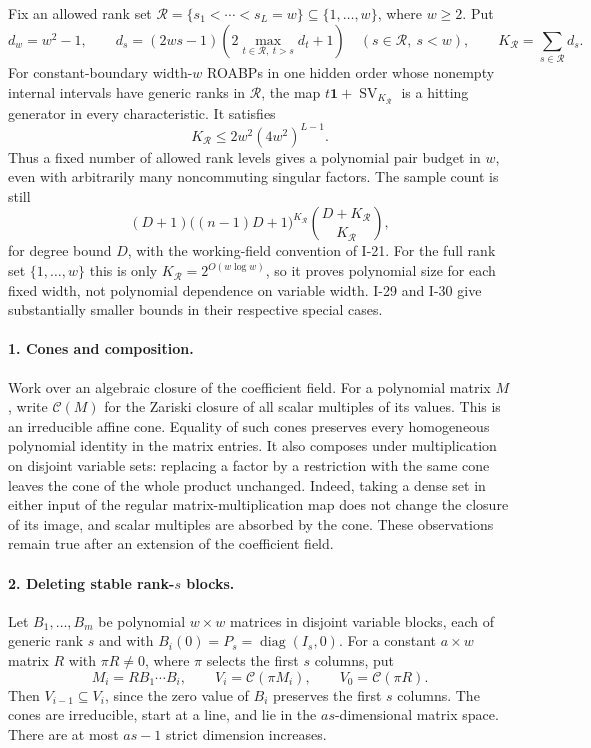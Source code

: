 Fix an allowed rank set
$\mathcal R=\{s_1<\cdots<s_L=w\}\subseteq\{1,\ldots,w\}$,
where $w\ge2$.  Put
\[
 d_w=w^2-1,\qquad
 d_s=(2ws-1)\left(2\max_{t\in\mathcal R,\ t>s}d_t+1\right)
       \quad(s\in\mathcal R,\ s<w),
 \qquad K_{\mathcal R}=\sum_{s\in\mathcal R}d_s.
 \tag{I.50}
\]
For constant-boundary width-$w$ ROABPs in one hidden order
whose nonempty internal intervals have generic ranks in
$\mathcal R$, the map $t\mathbf1+\operatorname{SV}_{K_{\mathcal R}}$
is a hitting generator in every characteristic.  It satisfies
\[
 K_{\mathcal R}\le2w^2(4w^2)^{L-1}.
 \tag{I.51}
\]
Thus a fixed number of allowed rank levels gives a polynomial
pair budget in $w$, even with arbitrarily many noncommuting
singular factors.  The sample count is still
\[
 (D+1)\bigl((n-1)D+1\bigr)^{K_{\mathcal R}}
                  \binom{D+K_{\mathcal R}}{K_{\mathcal R}},
 \tag{I.52}
\]
for degree bound $D$, with the working-field convention of
I-21.  For the full rank set $\{1,\ldots,w\}$ this is only
$K_{\mathcal R}=2^{O(w\log w)}$, so it proves polynomial size
for each fixed width, not polynomial dependence on variable
width.  I-29 and I-30 give substantially smaller bounds in
their respective special cases.

\paragraph{1. Cones and composition.}
Work over an algebraic closure of the coefficient field.
For a polynomial matrix $M$, write $\mathcal C(M)$ for the
Zariski closure of all scalar multiples of its values.
This is an irreducible affine cone.  Equality of such cones
preserves every homogeneous polynomial identity in the matrix
entries.  It also composes under multiplication on disjoint
variable sets: replacing a factor by a restriction with the
same cone leaves the cone of the whole product unchanged.
Indeed, taking a dense set in either input of the regular
matrix-multiplication map does not change the closure of its
image, and scalar multiples are absorbed by the cone.
These observations remain true after an extension of the
coefficient field.

\paragraph{2. Deleting stable rank-$s$ blocks.}
Let $B_1,\ldots,B_m$ be polynomial $w\times w$ matrices in
disjoint variable blocks, each of generic rank $s$ and with
$B_i(0)=P_s=\operatorname{diag}(I_s,0)$.
For a constant $a\times w$ matrix $R$ with $\pi R\ne0$,
where $\pi$ selects the first $s$ columns, put
\[
 M_i=RB_1\cdots B_i,\qquad
 V_i=\mathcal C(\pi M_i),\qquad V_0=\mathcal C(\pi R).
\]
Then $V_{i-1}\subseteq V_i$, since the zero value of $B_i$
preserves the first $s$ columns.  The cones are irreducible,
start at a line, and lie in the $as$-dimensional matrix space.
There are at most $as-1$ strict dimension increases.


